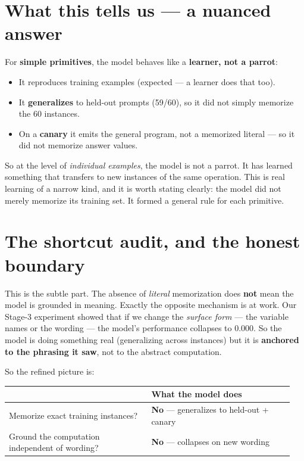 \section{What this tells us --- a nuanced
answer}\label{what-this-tells-us-a-nuanced-answer}

For \textbf{simple primitives}, the model behaves like a
\textbf{learner, not a parrot}:

\begin{itemize}
\tightlist
\item
  It reproduces training examples (expected --- a learner does that
  too).
\item
  It \textbf{generalizes} to held-out prompts (59/60), so it did not
  simply memorize the 60 instances.
\item
  On a \textbf{canary} it emits the general program, not a memorized
  literal --- so it did not memorize answer values.
\end{itemize}

So at the level of \emph{individual examples}, the model is not a
parrot. It has learned something that transfers to new instances of the
same operation. This is real learning of a narrow kind, and it is worth
stating clearly: the model did not merely memorize its training set. It
formed a general rule for each primitive.

\section{The shortcut audit, and the honest
boundary}\label{the-shortcut-audit-and-the-honest-boundary}

This is the subtle part. The absence of \emph{literal} memorization does
\textbf{not} mean the model is grounded in meaning. Exactly the opposite
mechanism is at work. Our Stage-3 experiment showed that if we change
the \emph{surface form} --- the variable names or the wording --- the
model's performance collapses to 0.000. So the model is doing something
real (generalizing across instances) but it is \textbf{anchored to the
phrasing it saw}, not to the abstract computation.

So the refined picture is:

\begin{longtable}[]{@{}
  >{\raggedright\arraybackslash}p{0.4750\linewidth}
>{\raggedright\arraybackslash}p{0.4750\linewidth}
@{}}
\toprule\noalign{}
\begin{minipage}[b]{\linewidth}\raggedright
\end{minipage} & \begin{minipage}[b]{\linewidth}\raggedright
What the model does
\end{minipage} \\
\midrule\noalign{}
\endhead
\bottomrule\noalign{}
\endlastfoot
Memorize exact training instances? & \textbf{No} --- generalizes to
held-out + canary \\
Ground the computation independent of wording? & \textbf{No} ---
collapses on new wording \\
\end{longtable}

